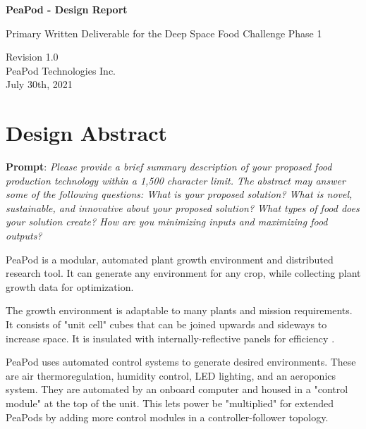\documentclass{../tex/report}
\begin{document}
\begin{titlepage}
    \begin{center}
        \vspace*{1.2cm}

        \textbf{\large{PeaPod - Design Report}}

        \vspace{0.5cm}

        Primary Written Deliverable for the Deep Space Food Challenge Phase 1

        \vfill
        
        \vspace{1.25cm}

        Revision 1.0\\
        PeaPod Technologies Inc.\\
        July 30th, 2021

    \end{center}
\end{titlepage}

\thispagestyle{plain}

\tableofcontents
\newpage

\section{Design Abstract}
\textbf{Prompt}: \textit{Please provide a brief summary description of your proposed food production technology within a 1,500 character limit. The abstract may answer some of the following questions: What is your proposed solution? What is novel, sustainable, and innovative about your proposed solution? What types of food does your solution create? How are you minimizing inputs and maximizing food outputs?}

PeaPod is a modular, automated plant growth environment and distributed research tool. It can generate any environment for any crop, while collecting plant growth data for optimization.

The growth environment is adaptable to many plants and mission requirements. It consists of "unit cell" cubes that can be joined upwards and sideways to increase space. It is insulated with internally-reflective panels for efficiency \cite{insulation}.

PeaPod uses automated control systems to generate desired environments. These are air thermoregulation, humidity control, LED lighting, and an aeroponics system. They are automated by an onboard computer and housed in a "control module" at the top of the unit. This lets power be "multiplied" for extended PeaPods by adding more control modules in a controller-follower topology.
\end{document}

